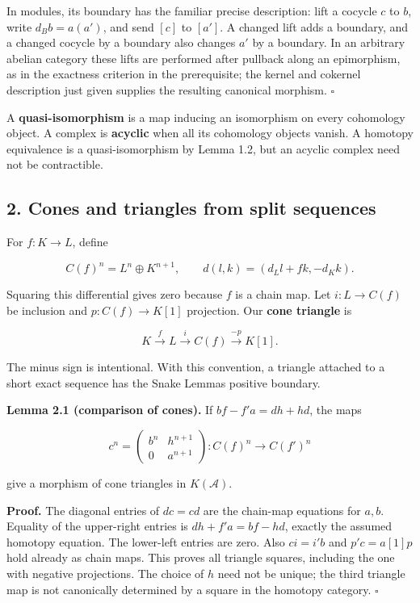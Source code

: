 \documentclass[
  english,
  11pt,
  a4paper,
]{article}
\begin{document}
In modules, its boundary has the familiar precise description: lift a
cocycle \(c\) to \(b\), write \(d_Bb=a(a')\), and send \([c]\) to
\([a']\). A changed lift adds a boundary, and a changed cocycle by a
boundary also changes \(a'\) by a boundary. In an arbitrary abelian
category these lifts are performed after pullback along an epimorphism,
as in the exactness criterion in the prerequisite; the kernel and
cokernel description just given supplies the resulting canonical
morphism. \(\square\)

A \textbf{quasi-isomorphism} is a map inducing an isomorphism on every
cohomology object. A complex is \textbf{acyclic} when all its cohomology
objects vanish. A homotopy equivalence is a quasi-isomorphism by Lemma
1.2, but an acyclic complex need not be contractible.

\subsection{2. Cones and triangles from split
sequences}\label{complexes-cones-and-localization--2-cones-and-triangles-from-split-sequences}

For \(f:K\to L\), define

\[C(f)^n=L^n\oplus K^{n+1},\qquad
d(l,k)=(d_Ll+fk,-d_Kk).
\tag{2.1}\]

Squaring this differential gives zero because \(f\) is a chain map. Let
\(i:L\to C(f)\) be inclusion and \(p:C(f)\to K[1]\) projection. Our
\textbf{cone triangle} is

\[K\xrightarrow fL\xrightarrow iC(f)\xrightarrow{-p}K[1].
\tag{2.2}\]

The minus sign is intentional. With this convention, a triangle attached
to a short exact sequence has the Snake Lemma\textquotesingle s positive
boundary.

\textbf{Lemma 2.1 (comparison of cones).} If \(bf-f'a=d h+h d\), the
maps

\[c^n=\begin{pmatrix}b^n&h^{n+1}\\0&a^{n+1}\end{pmatrix}:
C(f)^n\longrightarrow C(f')^n\]

give a morphism of cone triangles in \(K(\mathcal A)\).

\textbf{Proof.} The diagonal entries of \(d c=c d\) are the chain-map
equations for \(a,b\). Equality of the upper-right entries is
\(d h+f'a=bf-hd\), exactly the assumed homotopy equation. The lower-left
entries are zero. Also \(c i=i'b\) and \(p'c=a[1]p\) hold already as
chain maps. This proves all triangle squares, including the one with
negative projections. The choice of \(h\) need not be unique; the third
triangle map is not canonically determined by a square in the homotopy
category. \(\square\)
\end{document}
